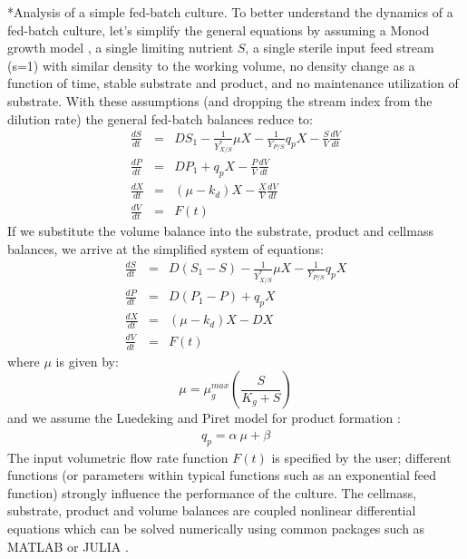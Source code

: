 \documentclass[11pt]{article}
\makeatletter
\theoremstyle{definition}
\renewcommand\subsection{\@startsection
	{subsection}{2}{0mm}
	{-0.05in}
	{-0.5\baselineskip}
	{\normalfont\normalsize\bfseries}}
\makeatother
\begin{document}
\subsection*{Analysis of a simple fed-batch culture.}
To better understand the dynamics of a fed-batch culture, let's simplify the general equations by assuming a Monod growth model \citep{Legout:2010aa}, a single limiting nutrient $S$, a single sterile input feed stream (s=1)
with similar density to the working volume, no density change as a function of time, stable substrate and product, and no maintenance utilization of substrate.
With these assumptions (and dropping the stream index from the dilution rate) the general fed-batch balances reduce to:
\begin{eqnarray}\label{eqn-metabolite-batch-simple}
	\frac{dS}{dt} &=& DS_{1} - \frac{1}{Y_{X/S}^{*}}\mu X - \frac{1}{Y_{P/S}}q_{p} X - \frac{S}{V}\frac{dV}{dt}\\
	\frac{dP}{dt} &=& DP_{1} + q_{p}X - \frac{P}{V}\frac{dV}{dt}\\
	\frac{dX}{dt} &=& \left(\mu - k_{d}\right)X - \frac{X}{V}\frac{dV}{dt}\\
	\frac{dV}{dt} &=& F\left(t\right)
\end{eqnarray}
If we substitute the volume balance into the substrate, product and cellmass balances, we arrive at the simplified system of equations:
\begin{eqnarray}\label{eqn-metabolite-fedbatch-simple}
	\frac{dS}{dt} &=& D\left(S_{1} - S\right) - \frac{1}{Y_{X/S}^{*}}\mu X - \frac{1}{Y_{P/S}}q_{p} X\\
	\frac{dP}{dt} &=& D\left(P_{1}- P\right) + q_{p}X\\
	\frac{dX}{dt} &=& \left(\mu - k_{d}\right)X - DX \\
	\frac{dV}{dt} &=& F\left(t\right)
\end{eqnarray}
where $\mu$ is given by:
\begin{equation}\label{eqn-monod-growth-model}
	\mu = \mu_{g}^{max}\left(\frac{S}{K_{g} + S}\right)
\end{equation} and we assume the Luedeking and Piret model for product formation \citep{Luedeking:2000aa}:
\begin{eqnarray}
	q_{p} = \alpha~\mu+\beta
\end{eqnarray}
The input volumetric flow rate function $F(t)$ is specified by the user; different functions (or parameters within typical functions such as an exponential feed function) strongly influence the performance of the culture.
The cellmass, substrate, product and volume balances are coupled nonlinear differential equations which can be solved numerically using common packages such as MATLAB or JULIA \citep{BEKS14}.
\end{document}
